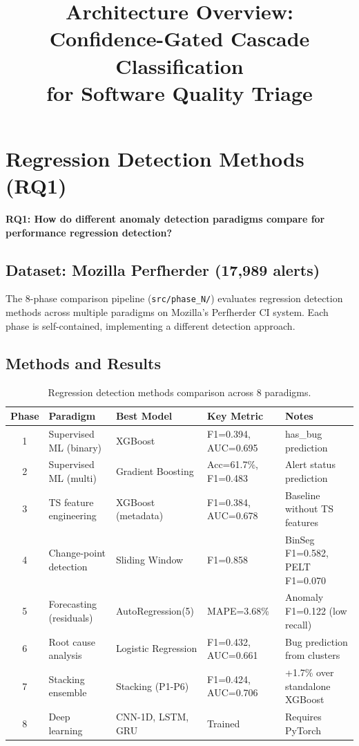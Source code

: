\documentclass[11pt]{article}
\title{Architecture Overview: Confidence-Gated Cascade Classification\\for Software Quality Triage}
\author{}
\date{}
\begin{document}
\maketitle

\section{Regression Detection Methods (RQ1)}
\label{sec:rq1}

\textbf{RQ1: How do different anomaly detection paradigms compare for performance regression detection?}

\subsection{Dataset: Mozilla Perfherder (17,989 alerts)}

The 8-phase comparison pipeline (\texttt{src/phase\_N/}) evaluates regression detection methods across multiple paradigms on Mozilla's Perfherder CI system. Each phase is self-contained, implementing a different detection approach.

\subsection{Methods and Results}

\begin{table}[h]
\centering
\caption{Regression detection methods comparison across 8 paradigms.}
\label{tab:rq1-methods}
\begin{tabular}{clllp{4cm}}
\toprule
\textbf{Phase} & \textbf{Paradigm} & \textbf{Best Model} & \textbf{Key Metric} & \textbf{Notes} \\
\midrule
1 & Supervised ML (binary) & XGBoost & F1=0.394, AUC=0.695 & has\_bug prediction \\
2 & Supervised ML (multi) & Gradient Boosting & Acc=61.7\%, F1=0.483 & Alert status prediction \\
3 & TS feature engineering & XGBoost (metadata) & F1=0.384, AUC=0.678 & Baseline without TS features \\
4 & Change-point detection & Sliding Window & F1=0.858 & BinSeg F1=0.582, PELT F1=0.070 \\
5 & Forecasting (residuals) & AutoRegression(5) & MAPE=3.68\% & Anomaly F1=0.122 (low recall) \\
6 & Root cause analysis & Logistic Regression & F1=0.432, AUC=0.661 & Bug prediction from clusters \\
7 & Stacking ensemble & Stacking (P1-P6) & F1=0.424, AUC=0.706 & +1.7\% over standalone XGBoost \\
8 & Deep learning & CNN-1D, LSTM, GRU & Trained & Requires PyTorch \\
\bottomrule
\end{tabular}
\end{table}
\end{document}
